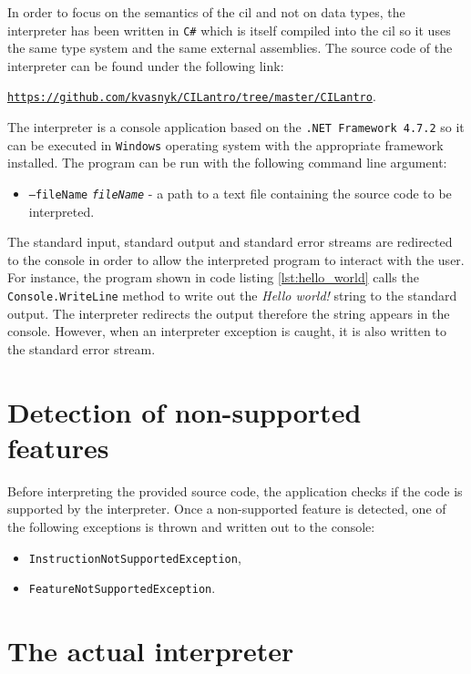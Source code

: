 \documentclass[declaration,shortabstract,english,mgr]{iithesis}
\begin{document}
In order to focus on the semantics of the \acrshort{cil} and not on data types, the interpreter has been written in \texttt{C\#} which is itself compiled into the \acrshort{cil} so it uses the same type system and the same external assemblies. The source code of the interpreter can be found under the following link:

\begin{center}
	\href{https://github.com/kvasnyk/CILantro/tree/master/CILantro}{\texttt{https://github.com/kvasnyk/CILantro/tree/master/CILantro}}.
\end{center}

The interpreter is a console application based on the \texttt{.NET Framework 4.7.2} so it can be executed in \texttt{Windows} operating system with the appropriate framework installed. The program can be run with the following command line argument:
\begin{itemize}
	\item{\texttt{--fileName} \texttt{\textit{fileName}} - a path to a text file containing the source code to be interpreted.}
\end{itemize}

The standard input, standard output and standard error streams are redirected to the console in order to allow the interpreted program to interact with the user. For instance, the program shown in code listing \ref{lst:hello_world} calls the \texttt{Console.WriteLine} method to write out the \textit{Hello world!} string to the standard output. The interpreter redirects the output therefore the string appears in the console. However, when an interpreter exception is caught, it is also written to the standard error stream.

\section{Detection of non-supported features}

Before interpreting the provided source code, the application checks if the code is supported by the interpreter. Once a non-supported feature is detected, one of the following exceptions is thrown and written out to the console:
\begin{itemize}
	\item{\texttt{InstructionNotSupportedException},}
	\item{\texttt{FeatureNotSupportedException}.}
\end{itemize}

\section{The actual interpreter}
\end{document}
